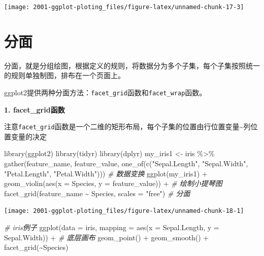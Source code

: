 \documentclass[
]{book}
\newenvironment{Shaded}{\begin{snugshade}}{\end{snugshade}}
\newcommand{\AttributeTok}[1]{\textcolor[rgb]{0.77,0.63,0.00}{#1}}
\newcommand{\CommentTok}[1]{\textcolor[rgb]{0.56,0.35,0.01}{\textit{#1}}}
\newcommand{\FunctionTok}[1]{\textcolor[rgb]{0.00,0.00,0.00}{#1}}
\newcommand{\NormalTok}[1]{#1}
\newcommand{\OtherTok}[1]{\textcolor[rgb]{0.56,0.35,0.01}{#1}}
\newcommand{\SpecialCharTok}[1]{\textcolor[rgb]{0.00,0.00,0.00}{#1}}
\newcommand{\StringTok}[1]{\textcolor[rgb]{0.31,0.60,0.02}{#1}}
\begin{document}
\begin{center}\texttt{[image: 2001-ggplot-ploting\_files/figure-latex/unnamed-chunk-17-3]} \end{center}

\hypertarget{ux5206ux9762}{%
\section{分面}\label{ux5206ux9762}}

分面，就是分组绘图，根据定义的规则，将数据分为多个子集，每个子集按照统一的规则单独制图，排布在一个页面上。

ggplot2提供两种分面方法：\texttt{facet\_grid}函数和\texttt{facet\_wrap}函数。

\textbf{1. facet\_grid函数}

注意\texttt{facet\_grid}函数是一个二维的矩形布局，每个子集的位置由行位置变量\textasciitilde 列位置变量的决定

\begin{Shaded}
\begin{Highlighting}[]
\FunctionTok{library}\NormalTok{(ggplot2)}
\FunctionTok{library}\NormalTok{(tidyr)}
\FunctionTok{library}\NormalTok{(dplyr)}
\NormalTok{my\_iris1 }\OtherTok{\textless{}{-}}\NormalTok{ iris }\SpecialCharTok{\%\textgreater{}\%} \FunctionTok{gather}\NormalTok{(feature\_name, feature\_value, }\FunctionTok{one\_of}\NormalTok{(}\FunctionTok{c}\NormalTok{(}\StringTok{"Sepal.Length"}\NormalTok{, }\StringTok{"Sepal.Width"}\NormalTok{, }\StringTok{"Petal.Length"}\NormalTok{, }\StringTok{"Petal.Width"}\NormalTok{)))  }\CommentTok{\# 数据变换}
\FunctionTok{ggplot}\NormalTok{(my\_iris1) }\SpecialCharTok{+} 
  \FunctionTok{geom\_violin}\NormalTok{(}\FunctionTok{aes}\NormalTok{(}\AttributeTok{x =}\NormalTok{ Species, }\AttributeTok{y =}\NormalTok{ feature\_value)) }\SpecialCharTok{+}  \CommentTok{\# 绘制小提琴图}
  \FunctionTok{facet\_grid}\NormalTok{(feature\_name }\SpecialCharTok{\textasciitilde{}}\NormalTok{ Species, }\AttributeTok{scales =} \StringTok{"free"}\NormalTok{)  }\CommentTok{\# 分面}
\end{Highlighting}
\end{Shaded}

\begin{center}\texttt{[image: 2001-ggplot-ploting\_files/figure-latex/unnamed-chunk-18-1]} \end{center}

\begin{Shaded}
\begin{Highlighting}[]
\CommentTok{\# iris例子}
\FunctionTok{ggplot}\NormalTok{(}\AttributeTok{data =}\NormalTok{ iris, }\AttributeTok{mapping =} \FunctionTok{aes}\NormalTok{(}\AttributeTok{x =}\NormalTok{ Sepal.Length, }\AttributeTok{y =}\NormalTok{ Sepal.Width)) }\SpecialCharTok{+}  \CommentTok{\# 底层画布}
  \FunctionTok{geom\_point}\NormalTok{() }\SpecialCharTok{+}
  \FunctionTok{geom\_smooth}\NormalTok{() }\SpecialCharTok{+}
  \FunctionTok{facet\_grid}\NormalTok{(}\SpecialCharTok{\textasciitilde{}}\NormalTok{Species)}
\end{Highlighting}
\end{Shaded}
\end{document}
